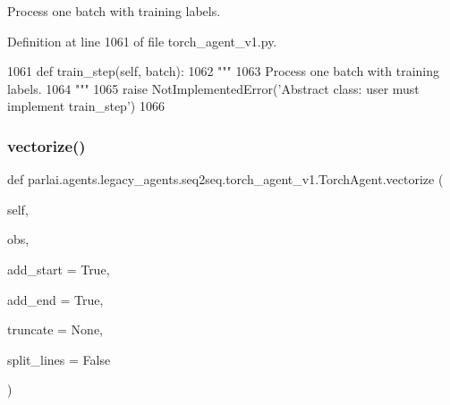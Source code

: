 \begin{DoxyVerb}Process one batch with training labels.
\end{DoxyVerb}
 

Definition at line 1061 of file torch\+\_\+agent\+\_\+v1.\+py.


\begin{DoxyCode}
1061     \textcolor{keyword}{def }train\_step(self, batch):
1062         \textcolor{stringliteral}{"""}
1063 \textcolor{stringliteral}{        Process one batch with training labels.}
1064 \textcolor{stringliteral}{        """}
1065         \textcolor{keywordflow}{raise} NotImplementedError(\textcolor{stringliteral}{'Abstract class: user must implement train\_step'})
1066 
\end{DoxyCode}
\mbox{\label{classparlai_1_1agents_1_1legacy__agents_1_1seq2seq_1_1torch__agent__v1_1_1TorchAgent_a866838e1c81063a3ec18c5609e029f90}} 
\subsubsection{\texorpdfstring{vectorize()}{vectorize()}}
{\footnotesize\ttfamily def parlai.\+agents.\+legacy\+\_\+agents.\+seq2seq.\+torch\+\_\+agent\+\_\+v1.\+Torch\+Agent.\+vectorize (\begin{DoxyParamCaption}\item[{}]{self,  }\item[{}]{obs,  }\item[{}]{add\+\_\+start = {\ttfamily True},  }\item[{}]{add\+\_\+end = {\ttfamily True},  }\item[{}]{truncate = {\ttfamily None},  }\item[{}]{split\+\_\+lines = {\ttfamily False} }\end{DoxyParamCaption})}

